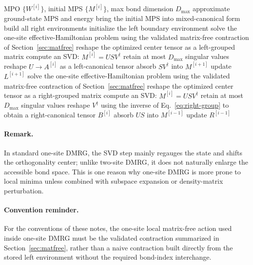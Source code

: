 \documentclass[aps,prb,onecolumn,nofootinbib]{revtex4-2}
\begin{document}
	\begin{algorithm}[H]
		\caption{OneSiteDMRG}
		\begin{algorithmic}[1]
			\Require MPO $\{W^{[i]}\}$, initial MPS $\{M^{[i]}\}$, max bond dimension $D_{\max}$
			\Ensure approximate ground-state MPS and energy
			\State bring the initial MPS into mixed-canonical form
			\State build all right environments
			\State initialize the left boundary environment
			\Repeat
			\State solve the one-site effective-Hamiltonian problem using the validated matrix-free contraction of Section~\ref{sec:matfree}
			\State reshape the optimized center tensor as a left-grouped matrix
			\State compute an SVD: $M^{[i]} = U S V^\dagger$
			\State retain at most $D_{\max}$ singular values
			\State reshape $U \to A^{[i]}$ as a left-canonical tensor
			\State absorb $S V^\dagger$ into $M^{[i+1]}$
			\State update $L^{[i+1]}$
			\EndFor
			\State solve the one-site effective-Hamiltonian problem using the validated matrix-free contraction of Section~\ref{sec:matfree}
			\State reshape the optimized center tensor as a right-grouped matrix
			\State compute an SVD: $M^{[i]} = U S V^\dagger$
			\State retain at most $D_{\max}$ singular values
			\State reshape $V^\dagger$ using the inverse of Eq.~\eqref{eq:right-group} to obtain a right-canonical tensor $B^{[i]}$
			\State absorb $U S$ into $M^{[i-1]}$
			\State update $R^{[i-1]}$
			\EndFor
		\end{algorithmic}
	\end{algorithm}
	
	\paragraph{Remark.}
	In standard one-site DMRG, the SVD step mainly regauges the state and shifts the orthogonality
	center; unlike two-site DMRG, it does not naturally enlarge the accessible bond space. This is
	one reason why one-site DMRG is more prone to local minima unless combined with subspace expansion
	or density-matrix perturbation.
	
	\paragraph{Convention reminder.}
	For the conventions of these notes, the one-site local matrix-free action used inside one-site
	DMRG must be the validated contraction summarized in Section~\ref{sec:matfree}, rather than a
	naive contraction built directly from the stored left environment without the required bond-index
	interchange.
	
\end{document}
